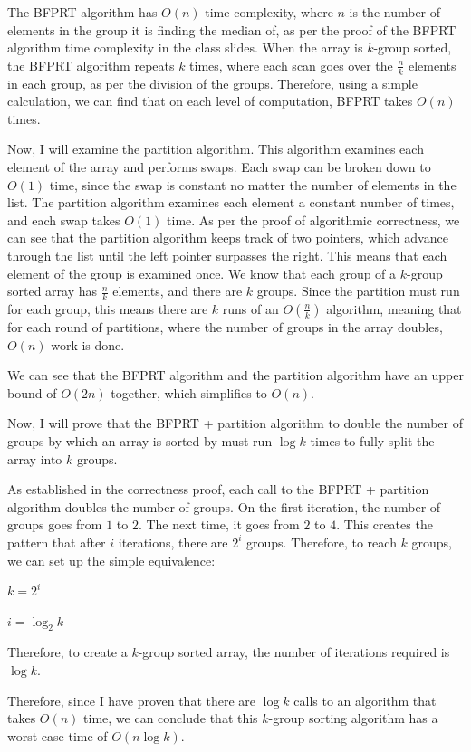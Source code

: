 \documentclass[11pt]{article}
\begin{document}
The BFPRT algorithm has $O(n)$ time complexity, where $n$ is the number of elements in the group it is finding the median of, 
as per the proof of the BFPRT algorithm time complexity in the class slides. 
When the array is $k$-group sorted, the BFPRT algorithm repeats $k$ times, where each scan goes over the $\frac{n}{k}$ elements in each group, 
as per the division of the groups. 
Therefore, using a simple calculation, we can find that on each level of computation, BFPRT takes $O(n)$ times.

Now, I will examine the partition algorithm. This algorithm examines each element of the array and performs swaps. 
Each swap can be broken down to $O(1)$ time, since the swap is constant no matter the number of elements in the list. 
The partition algorithm examines each element a constant number of times, and each swap takes $O(1)$ time. 
As per the proof of algorithmic correctness, we can see that the partition algorithm keeps track of two pointers, 
which advance through the list until the left pointer surpasses the right. 
This means that each element of the group is examined once. 
We know that each group of a $k$-group sorted array has $\frac{n}{k}$ elements, and there are $k$ groups. 
Since the partition must run for each group, this means there are $k$ runs of an $O(\frac{n}{k})$ algorithm, meaning that for each round of partitions, 
where the number of groups in the array doubles, $O(n)$ work is done.

We can see that the BFPRT algorithm and the partition algorithm have an upper bound of $O(2n)$ together, 
which simplifies to $O(n)$.

Now, I will prove that the BFPRT + partition algorithm to double the number of groups by which an array is sorted by 
must run $\log k$ times to fully split the array into $k$ groups.

As established in the correctness proof, each call to the BFPRT + partition algorithm doubles the number of groups. 
On the first iteration, the number of groups goes from $1$ to $2$. The next time, it goes from $2$ to $4$. 
This creates the pattern that after $i$ iterations, there are $2^i$ groups. 
Therefore, to reach $k$ groups, we can set up the simple equivalence:

$k = 2^i$

$i = \log_{2} k$

Therefore, to create a $k$-group sorted array, the number of iterations required is $\log k$. 

Therefore, since I have proven that there are $\log k$ calls to an algorithm that takes $O(n)$ time, 
we can conclude that this $k$-group sorting algorithm has a worst-case time of $O(n \log k)$.
\end{document}
